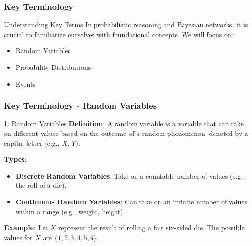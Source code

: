 \documentclass[aspectratio=169]{beamer}
\begin{document}
\begin{frame}[fragile]
  \frametitle{Key Terminology}
  \begin{block}{Understanding Key Terms}
    In probabilistic reasoning and Bayesian networks, it is crucial to familiarize ourselves with foundational concepts. 
    We will focus on:
    \begin{itemize}
      \item Random Variables
      \item Probability Distributions
      \item Events
    \end{itemize}
  \end{block}
\end{frame}

\begin{frame}[fragile]
  \frametitle{Key Terminology - Random Variables}
  \begin{block}{1. Random Variables}
    \textbf{Definition}: A random variable is a variable that can take on different values based on the outcome of a random phenomenon, denoted by a capital letter (e.g., $X$, $Y$).
  
    \textbf{Types}:
    \begin{itemize}
      \item \textbf{Discrete Random Variables}: Take on a countable number of values (e.g., the roll of a die).
      \item \textbf{Continuous Random Variables}: Can take on an infinite number of values within a range (e.g., weight, height).
    \end{itemize}

    \textbf{Example}: Let $X$ represent the result of rolling a fair six-sided die. The possible values for $X$ are $\{1, 2, 3, 4, 5, 6\}$.
  \end{block}
\end{frame}
\end{document}
